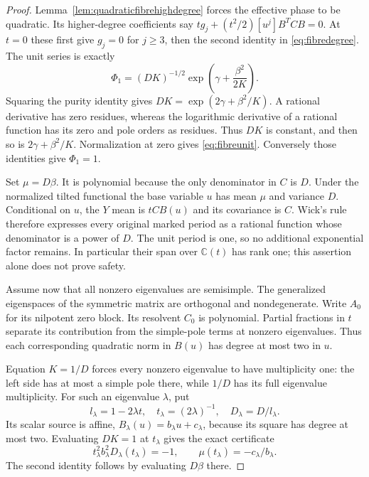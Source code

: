 \documentclass[11pt]{article}
\theoremstyle{definition}\newtheorem{definition}[theorem]{Definition}
\theoremstyle{remark}\newtheorem{remark}[theorem]{Remark}
\newcommand{\C}{\mathbb C}
\begin{document}
\begin{proof}
Lemma~\ref{lem:quadraticfibrehighdegree} forces the effective
phase to be quadratic. Its higher-degree coefficients say
$tg_j+(t^2/2)[u^j]B^TCB=0$. At $t=0$ these first give $g_j=0$
for $j\ge3$, then the second identity in
\eqref{eq:fibredegree}. The unit series is exactly
\[
 \Phi_1=(DK)^{-1/2}\exp\!\left(\gamma+\frac{\beta^2}{2K}\right).
\]
Squaring the purity identity gives
$DK=\exp(2\gamma+\beta^2/K)$. A rational derivative has zero
residues, whereas the logarithmic derivative of a rational
function has its zero and pole orders as residues. Thus $DK$
is constant, and then so is $2\gamma+\beta^2/K$.
Normalization at zero gives
\eqref{eq:fibreunit}. Conversely those identities give
$\Phi_1=1$.

Set $\mu=D\beta$. It is polynomial because the only denominator
in $C$ is $D$. Under the normalized tilted functional the base
variable $u$ has mean $\mu$ and variance $D$. Conditional on
$u$, the $Y$ mean is $tCB(u)$ and its covariance is $C$.
Wick's rule therefore expresses every original marked period
as a rational function whose denominator is a power of $D$.
The unit period is one, so no additional exponential factor
remains. In particular their span over $\C(t)$ has rank one;
this assertion alone does not prove safety.

Assume now that all nonzero eigenvalues are semisimple. The
generalized eigenspaces of the symmetric matrix are orthogonal
and nondegenerate. Write $A_0$ for its nilpotent zero block.
Its resolvent $C_0$ is polynomial. Partial fractions in $t$
separate its contribution from the simple-pole terms at
nonzero eigenvalues. Thus each corresponding quadratic norm
in $B(u)$ has degree at most two in $u$.

Equation $K=1/D$ forces every nonzero eigenvalue to have
multiplicity one: the left side has at most a simple pole
there, while $1/D$ has its full eigenvalue multiplicity.
For such an eigenvalue $\lambda$, put
\[
 l_\lambda=1-2\lambda t,\quad t_\lambda=(2\lambda)^{-1},
 \quad D_\lambda=D/l_\lambda.
\]
Its scalar source is affine, $B_\lambda(u)=b_\lambda u+c_\lambda$,
because its square has degree at most two. Evaluating $DK=1$
at $t_\lambda$ gives the exact certificate
\begin{equation}\label{eq:fibrepolecertificate}
 t_\lambda^2b_\lambda^2D_\lambda(t_\lambda)=-1,
 \qquad
 \mu(t_\lambda)=-c_\lambda/b_\lambda.
\end{equation}
The second identity follows by evaluating $D\beta$ there.


\end{proof}
\end{document}
